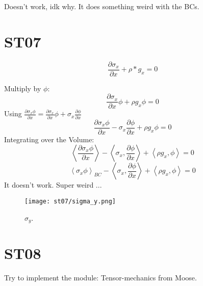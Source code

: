\documentclass[11pt,letterpaper]{article}
\begin{document}
Doesn't work, idk why. It does something weird with the BCs.

\section{ST07}

\begin{equation}
\frac{\partial \sigma_x}{\partial x} + \rho * g_x = 0
\end{equation}

Multiply by $\phi$:
\begin{equation}
\frac{\partial \sigma_x}{\partial x} \phi + \rho g_x \phi = 0
\end{equation}
Using $\frac{\partial \sigma_x \phi}{\partial x}=\frac{\partial \sigma_x}{\partial x} \phi + \sigma_x \frac{\partial \phi}{\partial x}$
\begin{equation}
\frac{\partial \sigma_x \phi}{\partial x} - \sigma_x \frac{\partial \phi}{\partial x} + \rho g_x \phi = 0
\end{equation}
Integrating over the Volume:
\begin{equation}
\left< \frac{\partial \sigma_x \phi}{\partial x} \right> - \left< \sigma_x,\frac{\partial \phi}{\partial x} \right> + \left< \rho g_x,\phi \right> = 0
\end{equation}
\begin{equation}
\left< \sigma_x \phi \right>_{BC} - \left< \sigma_x,\frac{\partial \phi}{\partial x} \right> + \left< \rho g_x,\phi \right> = 0
\end{equation}
It doesn't work. Super weird ...

\begin{figure}[H]
	\centering
	\texttt{[image: st07/sigma\_y.png]}
	\hfill
	\caption{$\sigma_y$.}
	\label{fig:st07}
\end{figure}

\section{ST08}

Try to implement the module: Tensor-mechanics from Moose.



\pagebreak 


\end{document}
